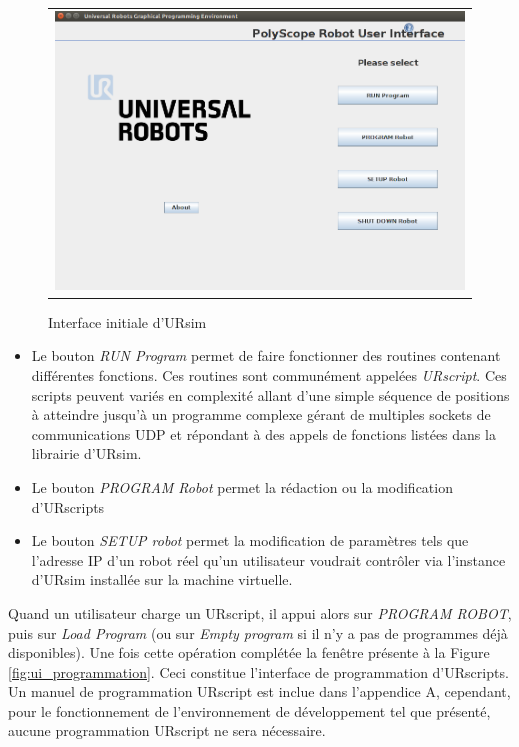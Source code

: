 \begin{figure}
 \begin{center}
  \begin{tabular}{c}
    \includegraphics[trim=0cm 0cm 0cm 0cm, scale=0.4]{screenshots_tuto_ursim/interface_init.png}
  \end{tabular}
 \end{center}
\caption{Interface initiale d'URsim}
 \label{fig:ui_start}
\end{figure}

\begin{itemize}
\item Le bouton \textit{RUN Program} permet de faire fonctionner des routines contenant différentes fonctions. Ces routines sont communément appelées \textit{URscript}. Ces scripts peuvent variés en complexité allant d'une simple séquence de positions à atteindre jusqu'à un programme complexe gérant de multiples sockets de communications UDP et répondant à des appels de fonctions listées dans la librairie d'URsim.
\item Le bouton \textit{PROGRAM Robot} permet la rédaction ou la modification d'URscripts
\item Le bouton \textit{SETUP robot} permet la modification de paramètres tels que l'adresse IP d'un robot réel qu'un utilisateur voudrait contrôler via l'instance d'URsim installée sur la machine virtuelle.
\end{itemize}

Quand un utilisateur charge un URscript, il appui alors sur \textit{PROGRAM ROBOT}, puis sur \textit{Load Program} (ou sur \textit{Empty program} si il n'y a pas de programmes déjà disponibles). Une fois cette opération complétée la fenêtre présente à la Figure \ref{fig:ui_programmation}. Ceci constitue l'interface de programmation d'URscripts. Un manuel de programmation URscript est inclue dans l'appendice A, cependant, pour le fonctionnement de l'environnement de développement tel que présenté, aucune programmation URscript ne sera nécessaire.

